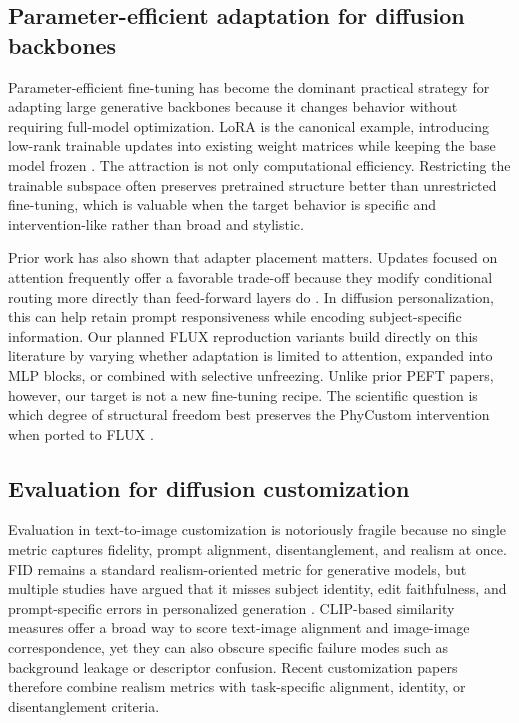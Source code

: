 \documentclass{article}
\begin{document}
\subsection{Parameter-efficient adaptation for diffusion backbones}

Parameter-efficient fine-tuning has become the dominant practical strategy for adapting large generative backbones because it changes behavior without requiring full-model optimization. LoRA is the canonical example, introducing low-rank trainable updates into existing weight matrices while keeping the base model frozen \cite{hu2021lora}. The attraction is not only computational efficiency. Restricting the trainable subspace often preserves pretrained structure better than unrestricted fine-tuning, which is valuable when the target behavior is specific and intervention-like rather than broad and stylistic.

Prior work has also shown that adapter placement matters. Updates focused on attention frequently offer a favorable trade-off because they modify conditional routing more directly than feed-forward layers do \cite{hu2021lora}. In diffusion personalization, this can help retain prompt responsiveness while encoding subject-specific information. Our planned FLUX reproduction variants build directly on this literature by varying whether adaptation is limited to attention, expanded into MLP blocks, or combined with selective unfreezing. Unlike prior PEFT papers, however, our target is not a new fine-tuning recipe. The scientific question is which degree of structural freedom best preserves the PhyCustom intervention when ported to FLUX \cite{wu2025phycustom,blackforestlabs2024fluxdev}.

\subsection{Evaluation for diffusion customization}

Evaluation in text-to-image customization is notoriously fragile because no single metric captures fidelity, prompt alignment, disentanglement, and realism at once. FID remains a standard realism-oriented metric for generative models, but multiple studies have argued that it misses subject identity, edit faithfulness, and prompt-specific errors in personalized generation \cite{ruiz2023dreambooth}. CLIP-based similarity measures offer a broad way to score text-image alignment and image-image correspondence, yet they can also obscure specific failure modes such as background leakage or descriptor confusion. Recent customization papers therefore combine realism metrics with task-specific alignment, identity, or disentanglement criteria.
\end{document}
